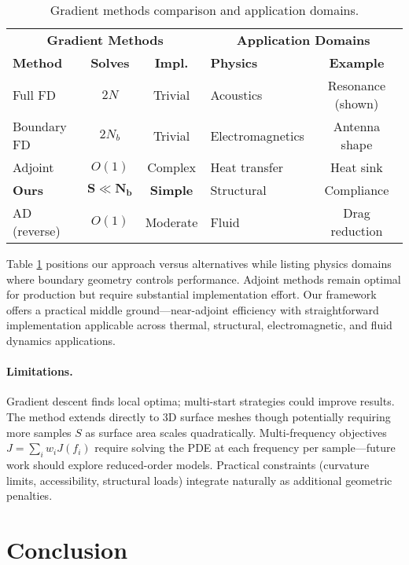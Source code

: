 \documentclass{article}
\begin{document}
\begin{table}[t]
\centering
\caption{Gradient methods comparison and application domains.}
\label{tab:comparison}
\small
\begin{tabular}{lcc|lc}
\toprule
\multicolumn{3}{c|}{\textbf{Gradient Methods}} & \multicolumn{2}{c}{\textbf{Application Domains}} \\
\textbf{Method} & \textbf{Solves} & \textbf{Impl.} & \textbf{Physics} & \textbf{Example} \\
\midrule
Full FD & $2N$ & Trivial & Acoustics & Resonance (shown) \\
Boundary FD & $2N_b$ & Trivial & Electromagnetics & Antenna shape \\
Adjoint & $O(1)$ & Complex & Heat transfer & Heat sink \\
\textbf{Ours} & $\mathbf{S \ll N_b}$ & \textbf{Simple} & Structural & Compliance \\
AD (reverse) & $O(1)$ & Moderate & Fluid & Drag reduction \\
\bottomrule
\end{tabular}
\end{table}

Table \ref{tab:comparison} positions our approach versus alternatives while listing physics domains where boundary geometry controls performance. Adjoint methods remain optimal for production but require substantial implementation effort. Our framework offers a practical middle ground—near-adjoint efficiency with straightforward implementation applicable across thermal, structural, electromagnetic, and fluid dynamics applications.

\paragraph{Limitations.} Gradient descent finds local optima; multi-start strategies could improve results. The method extends directly to 3D surface meshes though potentially requiring more samples $S$ as surface area scales quadratically. Multi-frequency objectives $J = \sum_i w_i J(f_i)$ require solving the PDE at each frequency per sample—future work should explore reduced-order models. Practical constraints (curvature limits, accessibility, structural loads) integrate naturally as additional geometric penalties.

\section{Conclusion}
\end{document}
